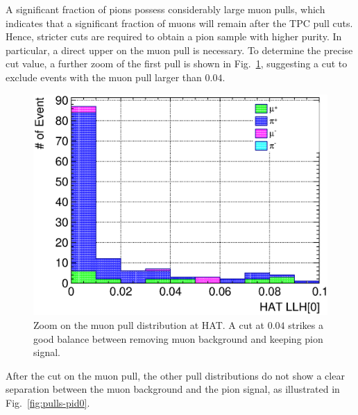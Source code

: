           A significant fraction of pions possess considerably large muon pulls, which indicates that a significant fraction of muons will remain after the TPC pull cuts.
          Hence, stricter cuts are required to obtain a pion sample with higher purity.
          In particular, a direct upper on the muon pull is necessary.
          To determine the precise cut value, a further zoom of the first pull is shown in Fig.~\ref{fig:pull0-zoom}, suggesting a cut to exclude events with the muon pull larger than $0.04$.
          \begin{figure}[ht]
               \centering
               \includegraphics[width=\textwidth]{figures/sel/sspi_TOP_hat_pid0_stack_al5_zoom.eps}
               \caption{Zoom on the muon pull distribution at HAT. A cut at $0.04$ strikes a good balance between removing muon background and keeping pion signal.}
               \label{fig:pull0-zoom}
          \end{figure}
          After the cut on the muon pull, the other pull distributions do not show a clear separation between the muon background and the pion signal, as illustrated in Fig.~\ref{fig:pulls-pid0}.
